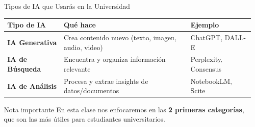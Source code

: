 \documentclass[aspectratio=169,xcolor={dvipsnames}]{beamer}
\begin{document}
	\begin{frame}{Tipos de IA que Usarás en la Universidad}
		
		\begin{table}
			\centering
			\begin{tabular}{p{3.5cm}p{5cm}p{3cm}}
				\toprule
				\textbf{Tipo de IA} & \textbf{Qué hace} & \textbf{Ejemplo} \\
				\midrule
				\textbf{IA Generativa} & Crea contenido nuevo (texto, imagen, audio, video) & ChatGPT, DALL-E \\
				\addlinespace
				\textbf{IA de Búsqueda} & Encuentra y organiza información relevante & Perplexity, Consensus \\
				\addlinespace
				\textbf{IA de Análisis} & Procesa y extrae insights de datos/documentos & NotebookLM, Scite \\
				\bottomrule
			\end{tabular}
		\end{table}
		
		\vspace{0.5cm}
		
		\begin{alertblock}{Nota importante}
			En esta clase nos enfocaremos en las \textbf{2 primeras categorías}, que son las más útiles para estudiantes universitarios.
		\end{alertblock}
		
	\end{frame}
	
\end{document}
